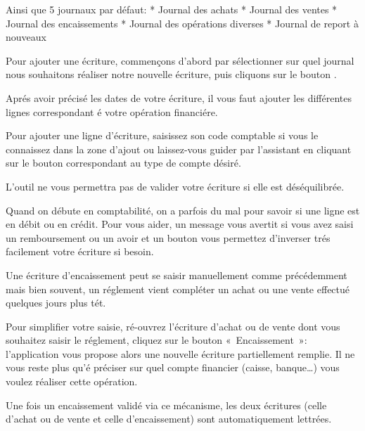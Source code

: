 \documentclass[a4paper,10pt,oneside,french]{sphinxmanual}
\begin{document}
Ainsi que 5 journaux par défaut:
* Journal des achats
* Journal des ventes
* Journal des encaissements
* Journal des opérations diverses
* Journal de report à nouveaux

Pour ajouter une écriture, commençons d’abord par sélectionner sur quel
journal nous souhaitons réaliser notre nouvelle écriture, puis cliquons
sur le bouton .

Aprés avoir précisé les dates de votre écriture, il vous faut
ajouter les différentes lignes correspondant é votre opération financiére.

Pour ajouter une ligne d’écriture, saisissez son code comptable
si vous le connaissez dans la zone d’ajout ou laissez-vous guider par
l’assistant en cliquant sur le bouton correspondant au type de compte désiré.
\begin{quote}

\noindent{}
\end{quote}

L’outil ne vous permettra pas de valider votre écriture si elle est déséquilibrée.

Quand on débute en comptabilité, on a parfois du mal pour savoir si une ligne est en débit ou en crédit. Pour vous aider, un message
vous avertit si vous avez saisi un remboursement ou un avoir et un bouton vous permettez d’inverser trés facilement votre écriture si besoin.
\begin{quote}

\end{quote}

Une écriture d’encaissement peut se saisir manuellement comme précédemment mais bien souvent, un réglement vient compléter un achat ou une vente effectué quelques jours plus tét.

Pour simplifier votre saisie, ré-ouvrez l’écriture d’achat ou de vente dont vous souhaitez saisir le réglement, cliquez sur le bouton « Encaissement »: l’application vous propose alors une nouvelle écriture
partiellement remplie. Il ne vous reste plus qu’é préciser sur quel compte financier (caisse, banque…) vous voulez réaliser cette opération.

Une fois un encaissement validé via ce mécanisme, les deux écritures (celle d’achat ou de vente et celle d’encaissement) sont automatiquement lettrées.
\begin{quote}

\end{quote}
\end{document}
